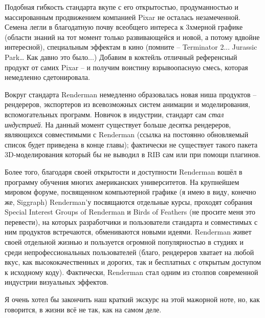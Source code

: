 Подобная гибкость стандарта вкупе с его
    открытостью, продуманностью и массированным продвижением
    компанией Pixar не осталась незамеченной. Семена легли в
    благодатную почву всеобщего интереса к 3хмерной графике (области
    знаний на тот момент только развивающейся и новой, а потому вдвойне
    интересной), специальным эффектам в кино (помните – Terminator
    2... Jurassic Park…
    Как давно это было...) Добавим в коктейль отличный референсный
    продукт от самих Pixar – и получим
    воистину взрывоопасную смесь, которая немедленно
    сдетонировала.
  

 Вокруг стандарта Renderman немедленно образовалась новая ниша продуктов – рендереров,
    экспортеров из всевозможных систем анимации и моделирования,
    вспомогательных программ. Новичок в индустрии, стандарт сам {\it стал индустрией}. На
    данный момент существует больше десятка рендереров, являющихся
    совместимыми с Renderman (ссылка
    на постоянно обновляемый список будет приведена в конце главы);
    фактически не существует такого пакета 3D-моделирования
    который бы не выводил в RIB сам или при
    помощи плагинов.
  

 Более того, благодаря своей открытости и
    доступности Renderman вошёл в программу обучения многих
    американских университетов. На крупнейшем мировом форуме,
    посвященном компьютерной графике (я имею в виду, конечно же, Siggraph) Renderman’у посвящаются отдельные курсы, проходят
    собрания Special Interest Groups of Renderman
    и Birds of Feathers (не
    просите меня это перевести), на которых разработчики и пользователи
    стандарта и совместимых с ним продуктов встречаются, обмениваются
    новыми идеями. Renderman живет
    своей отдельной жизнью и пользуется огромной популярностью в
    студиях и среди непрофессиональных пользователей (благо, рендереров
    хватает на любой вкус, как высококачественных и дорогих, так и
    бесплатных с открытым доступом к исходному коду).
    Фактически, Renderman стал
    одним из столпов современной индустрии визуальных
    эффектов.
  

 Я очень хотел бы закончить наш краткий экскурс на
    этой мажорной ноте, но, как говорится, в жизни всё не так, как на
    самом деле.
  

